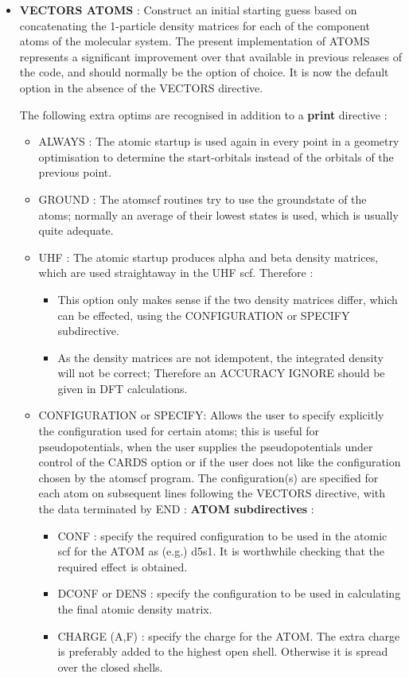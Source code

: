 \documentclass[11pt,fleqn]{article}
\begin{document}
\begin{itemize}

\item  {\bf VECTORS ATOMS} : Construct an initial starting guess
based on concatenating the 1-particle density matrices for each
of the component atoms of the molecular system.
The present implementation of ATOMS represents a significant 
improvement over that available in previous releases
of the code, and should normally be the option of choice.
It is now the default option in the absence of the VECTORS directive.

The following extra optims are recognised in addition to a {\bf print}
directive :
\begin{itemize}
\item ALWAYS : The atomic startup is used again in every point in a geometry 
optimisation to determine the start-orbitals instead of the orbitals of the previous 
point.
\item GROUND : The atomscf routines try to use the groundstate of the
atoms; normally an average of their lowest states is used, which is
usually quite adequate.
\item UHF : The atomic startup produces alpha and beta density matrices, 
which are used straightaway in the UHF scf. Therefore :
\begin{itemize}\item This option only makes sense if the two density matrices differ, which can be 
effected, using the CONFIGURATION or SPECIFY subdirective.
\item As the density matrices are not idempotent, the integrated density will not
be correct; Therefore an ACCURACY IGNORE should be given in DFT calculations.
\end{itemize}
\item CONFIGURATION or SPECIFY: Allows the user to specify explicitly the
configuration used for certain atoms; this is useful for
pseudopotentials, when the user supplies the pseudopotentials under
control of the CARDS option or if the user does not like the configuration
chosen by the atomscf program. The configuration(s) are specified for each atom on
subsequent lines following the VECTORS directive, with the data
terminated by END : {\bf ATOM subdirectives} :
\begin{itemize}
\item CONF : specify the required configuration to be used in the atomic scf 
for the ATOM as (e.g.) d5s1. It is worthwhile checking that the required effect is
obtained.
\item DCONF or DENS : specify the configuration to be used in calculating the 
final atomic density matrix.
\item CHARGE (A,F) : specify  the charge for the ATOM. The extra charge is preferably
added to the highest open shell. Otherwise it is spread over the closed shells.


\end{itemize}
\end{itemize}
\end{itemize}
\end{document}
